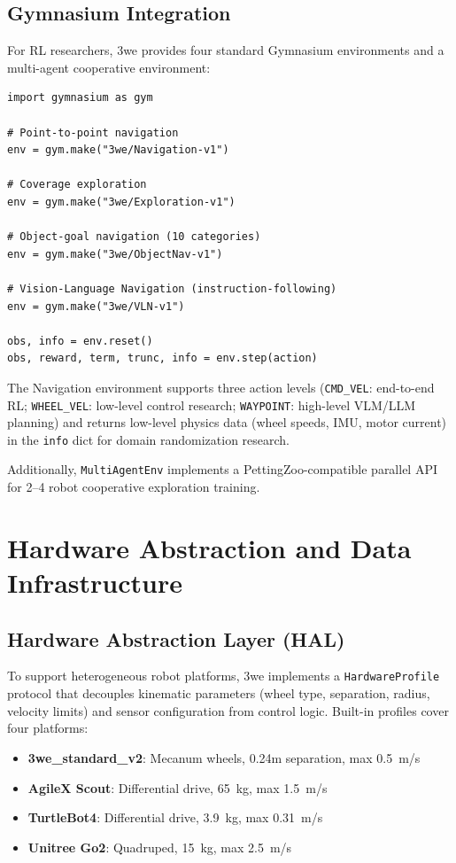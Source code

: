 \documentclass[conference]{IEEEtran}
\begin{document}
\subsection{Gymnasium Integration}

For RL researchers, 3we provides four standard Gymnasium environments and a multi-agent cooperative environment:

\begin{lstlisting}
import gymnasium as gym

# Point-to-point navigation
env = gym.make("3we/Navigation-v1")

# Coverage exploration
env = gym.make("3we/Exploration-v1")

# Object-goal navigation (10 categories)
env = gym.make("3we/ObjectNav-v1")

# Vision-Language Navigation (instruction-following)
env = gym.make("3we/VLN-v1")

obs, info = env.reset()
obs, reward, term, trunc, info = env.step(action)
\end{lstlisting}

The Navigation environment supports three action levels (\texttt{CMD\_VEL}: end-to-end RL; \texttt{WHEEL\_VEL}: low-level control research; \texttt{WAYPOINT}: high-level VLM/LLM planning) and returns low-level physics data (wheel speeds, IMU, motor current) in the \texttt{info} dict for domain randomization research.

Additionally, \texttt{MultiAgentEnv} implements a PettingZoo-compatible parallel API for 2--4 robot cooperative exploration training.

\section{Hardware Abstraction and Data Infrastructure}

\subsection{Hardware Abstraction Layer (HAL)}

To support heterogeneous robot platforms, 3we implements a \texttt{HardwareProfile} protocol that decouples kinematic parameters (wheel type, separation, radius, velocity limits) and sensor configuration from control logic. Built-in profiles cover four platforms:

\begin{itemize}
    \item \textbf{3we\_standard\_v2}: Mecanum wheels, 0.24m separation, max 0.5~m/s
    \item \textbf{AgileX Scout}: Differential drive, 65~kg, max 1.5~m/s
    \item \textbf{TurtleBot4}: Differential drive, 3.9~kg, max 0.31~m/s
    \item \textbf{Unitree Go2}: Quadruped, 15~kg, max 2.5~m/s
\end{itemize}
\end{document}
